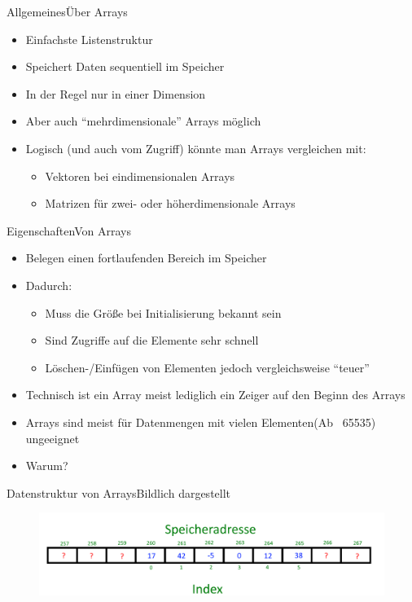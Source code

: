 \begin{frame}{Allgemeines}{Über Arrays}
	\begin{itemize}
		\item Einfachste Listenstruktur
		\item Speichert Daten sequentiell im Speicher
		\item In der Regel nur in einer Dimension
		\item Aber auch "`mehrdimensionale"' Arrays möglich
		\item Logisch (und auch vom Zugriff) könnte man Arrays vergleichen mit:
		\begin{itemize}
			\item Vektoren bei eindimensionalen Arrays
			\item Matrizen für zwei- oder höherdimensionale Arrays
		\end{itemize}
	\end{itemize}
\end{frame}

\begin{frame}{Eigenschaften}{Von Arrays}
	\begin{itemize}
		\item Belegen einen fortlaufenden Bereich im Speicher
		\item Dadurch:
		\begin{itemize}
			\item Muss die Größe bei Initialisierung bekannt sein
			\item Sind Zugriffe auf die Elemente sehr schnell
			\item Löschen-/Einfügen von Elementen jedoch vergleichsweise "`teuer"'
		\end{itemize}
		\item Technisch ist ein Array meist lediglich ein Zeiger auf den Beginn des Arrays
		\item Arrays sind meist für Datenmengen mit vielen Elementen(Ab ~65535) ungeeignet
		\item Warum?
	\end{itemize}
\end{frame}

\begin{frame}{Datenstruktur von Arrays}{Bildlich dargestellt}
	\begin{figure}
		\includegraphics[width=\textwidth]{graph/Array_base}
	\end{figure}
\end{frame}

